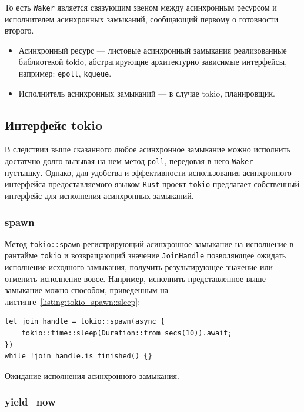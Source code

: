 То есть \verb|Waker| является связующим звеном между асинхронным ресурсом и исполнителем асинхронных замыканий, сообщающий первому о готовности второго.

\begin{itemize}
    \item Асинхронный ресурс --- листовые асинхронный замыкания реализованные библиотекой tokio, абстрагирующие архитектурно зависимые интерфейсы, например: \verb|epoll|, \verb|kqueue|.
    \item Исполнитель асинхронных замыканий --- в случае tokio, планировщик.
\end{itemize}

\subsection{Интерфейс tokio}

В следствии выше сказанного любое асинхронное замыкание можно исполнить достатчно долго вызывая на нем метод \verb|poll|, передовая в него \verb|Waker| --- пустышку. Однако, для удобства и эффективности использования асинхронного интерфейса предоставляемого языком \verb|Rust| проект \verb|tokio| предлагает собственный интерфейс для исполнения асинхронных замыканий.

\subsubsection{spawn}

Метод \verb|tokio::spawn| регистрирующий асинхронное замыкание на исполнение в рантайме \verb|tokio| и возвращающий значение \verb|JoinHandle| позволяющее ожидать исполнение исходного замыкания, получить результирующее значение или отменить исполнение вовсе. Например, исполнить представленное выше замыкание можно способом, приведенным на листинге~\ref{listing:tokio_spawn::sleep}:

\begin{listing}[H]
    \begin{verbatim}
let join_handle = tokio::spawn(async {
    tokio::time::sleep(Duration::from_secs(10)).await;
})
while !join_handle.is_finished() {}
    \end{verbatim}

    \caption{Ожидание исполнения асинхронного замыкания.}
    \label{listing:tokio_spawn::sleep}
\end{listing}

\subsubsection{yield\_now}

